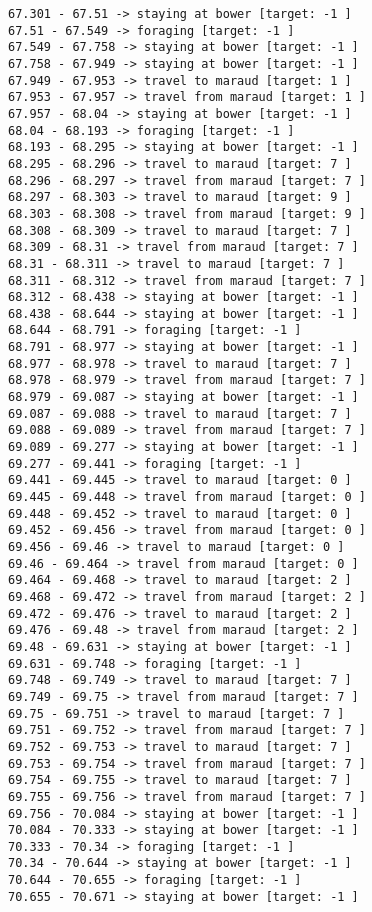 \documentclass[11pt]{article}
\begin{document}
\begin{Verbatim}[commandchars=\\\{\}]
67.301 - 67.51 -> staying at bower [target: -1 ]
67.51 - 67.549 -> foraging [target: -1 ]
67.549 - 67.758 -> staying at bower [target: -1 ]
67.758 - 67.949 -> staying at bower [target: -1 ]
67.949 - 67.953 -> travel to maraud [target: 1 ]
67.953 - 67.957 -> travel from maraud [target: 1 ]
67.957 - 68.04 -> staying at bower [target: -1 ]
68.04 - 68.193 -> foraging [target: -1 ]
68.193 - 68.295 -> staying at bower [target: -1 ]
68.295 - 68.296 -> travel to maraud [target: 7 ]
68.296 - 68.297 -> travel from maraud [target: 7 ]
68.297 - 68.303 -> travel to maraud [target: 9 ]
68.303 - 68.308 -> travel from maraud [target: 9 ]
68.308 - 68.309 -> travel to maraud [target: 7 ]
68.309 - 68.31 -> travel from maraud [target: 7 ]
68.31 - 68.311 -> travel to maraud [target: 7 ]
68.311 - 68.312 -> travel from maraud [target: 7 ]
68.312 - 68.438 -> staying at bower [target: -1 ]
68.438 - 68.644 -> staying at bower [target: -1 ]
68.644 - 68.791 -> foraging [target: -1 ]
68.791 - 68.977 -> staying at bower [target: -1 ]
68.977 - 68.978 -> travel to maraud [target: 7 ]
68.978 - 68.979 -> travel from maraud [target: 7 ]
68.979 - 69.087 -> staying at bower [target: -1 ]
69.087 - 69.088 -> travel to maraud [target: 7 ]
69.088 - 69.089 -> travel from maraud [target: 7 ]
69.089 - 69.277 -> staying at bower [target: -1 ]
69.277 - 69.441 -> foraging [target: -1 ]
69.441 - 69.445 -> travel to maraud [target: 0 ]
69.445 - 69.448 -> travel from maraud [target: 0 ]
69.448 - 69.452 -> travel to maraud [target: 0 ]
69.452 - 69.456 -> travel from maraud [target: 0 ]
69.456 - 69.46 -> travel to maraud [target: 0 ]
69.46 - 69.464 -> travel from maraud [target: 0 ]
69.464 - 69.468 -> travel to maraud [target: 2 ]
69.468 - 69.472 -> travel from maraud [target: 2 ]
69.472 - 69.476 -> travel to maraud [target: 2 ]
69.476 - 69.48 -> travel from maraud [target: 2 ]
69.48 - 69.631 -> staying at bower [target: -1 ]
69.631 - 69.748 -> foraging [target: -1 ]
69.748 - 69.749 -> travel to maraud [target: 7 ]
69.749 - 69.75 -> travel from maraud [target: 7 ]
69.75 - 69.751 -> travel to maraud [target: 7 ]
69.751 - 69.752 -> travel from maraud [target: 7 ]
69.752 - 69.753 -> travel to maraud [target: 7 ]
69.753 - 69.754 -> travel from maraud [target: 7 ]
69.754 - 69.755 -> travel to maraud [target: 7 ]
69.755 - 69.756 -> travel from maraud [target: 7 ]
69.756 - 70.084 -> staying at bower [target: -1 ]
70.084 - 70.333 -> staying at bower [target: -1 ]
70.333 - 70.34 -> foraging [target: -1 ]
70.34 - 70.644 -> staying at bower [target: -1 ]
70.644 - 70.655 -> foraging [target: -1 ]
70.655 - 70.671 -> staying at bower [target: -1 ]

\end{Verbatim}
\end{document}
